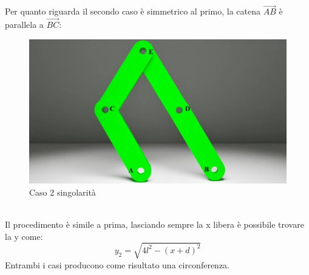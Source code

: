 Per quanto riguarda il secondo caso è simmetrico al primo, la catena $\overrightarrow{AB}$ è parallela a $\overrightarrow{BC}$:
\begin{figure}[ht]
	\begin{center}
		\includegraphics[scale=0.3]{Immagini/Singolarity/2}
		\caption{Caso 2 singolarità}
	\end{center}
\end{figure}
\\Il procedimento è simile a prima, lasciando sempre la x libera è possibile trovare la y come:
\begin{equation}
    y_2 = \sqrt{4l^2-(x+d)^2}
\end{equation}
Entrambi i casi producono come risultato una circonferenza.
